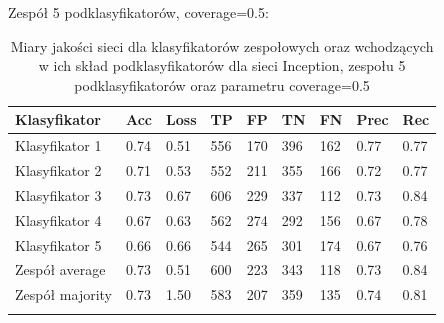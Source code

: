 \documentclass[polish,12pt]{aghthesis}
\begin{document}
\vspace{3mm}
\noindent Zespół 5 podklasyfikatorów, coverage=0.5:
\renewcommand{\arraystretch}{1.75}
 \begin{longtable}[h!]{|m{2.6cm}|m{1.2cm}|m{1.2cm}|m{1.2cm}|m{1.2cm}|m{1.2cm}|m{1.2cm}|m{1.2cm}|m{1.2cm}|}
 \hline
 Klasyfikator & Acc & Loss & TP & FP & TN & FN & Prec & Rec\\
 \hline
 Klasyfikator 1 & 0.74 & 0.51 & 556 & 170 & 396 & 162 & 0.77 & 0.77\\
 \hline
 Klasyfikator 2 & 0.71 & 0.53 & 552 & 211 & 355 & 166 & 0.72 & 0.77\\
 \hline
 Klasyfikator 3 & 0.73 & 0.67 & 606 & 229 & 337 & 112 & 0.73 & 0.84\\
 \hline
 Klasyfikator 4 & 0.67 & 0.63 & 562 & 274 & 292 & 156 & 0.67 & 0.78\\
 \hline
 Klasyfikator 5 & 0.66 & 0.66 & 544 & 265 & 301 & 174 & 0.67 & 0.76\\
 \hline
 Zespół average & 0.73 & 0.51 & 600 & 223 & 343 & 118 & 0.73 & 0.84\\ 
 \hline
 Zespół \newline majority & 0.73 & 1.50 & 583 & 207 & 359 & 135 & 0.74 & 0.81\\
 \hline
\caption{Miary jakości sieci dla klasyfikatorów zespołowych oraz wchodzących w ich skład podklasyfikatorów dla sieci Inception, zespołu 5 podklasyfikatorów oraz parametru coverage=0.5}
\label{table:27}
\end{longtable}
\end{document}
